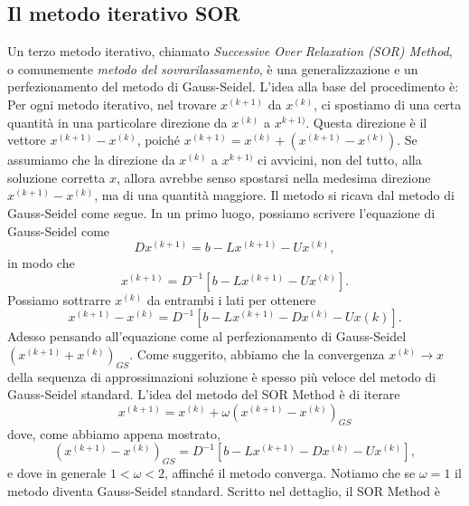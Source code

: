 \documentclass[12pt]{article}
\begin{document}
\subsection{Il metodo iterativo SOR}
Un terzo metodo iterativo, chiamato \textit{Successive Over Relaxation (SOR) Method}, o comunemente \textit{metodo del sovrarilassamento}, è una generalizzazione e un perfezionamento del metodo di Gauss-Seidel. L'idea alla base del procedimento è:
\\
Per ogni metodo iterativo, nel trovare \(x^{(k+1)}\) da \(x^{(k)}\), ci spostiamo di una certa quantità in una particolare direzione da \(x^{(k)}\) a \(x^{k+1)}\). Questa direzione è il vettore \(x^{(k+1)}-x^{(k)}\), poiché \(x^{(k+1)}=x^{(k)}+(x^{(k+1)}-x^{(k)})\). Se assumiamo che la direzione da \(x^{(k)}\) a \(x^{k+1)}\) ci avvicini, non del tutto, alla soluzione corretta \(x\), allora avrebbe senso spostarsi nella medesima direzione \(x^{(k+1)}-x^{(k)}\), ma di una quantità maggiore.
Il metodo si ricava dal metodo di Gauss-Seidel come segue. In un primo luogo, possiamo scrivere l'equazione di Gauss-Seidel come
\begin{equation*}
    Dx^{(k+1)}=b-Lx^{(k+1)}-Ux^{(k)},
\end{equation*}
in modo che
\begin{equation*}
    x^{(k+1)}=D^{-1}[b-Lx{^(k+1)}-Ux^{(k)}].
\end{equation*}
Possiamo sottrarre \(x^{(k)}\) da entrambi i lati per ottenere
\begin{equation*}
    x^{(k+1)}-x^{(k)}=D^{-1}[b-Lx^{(k+1)}-Dx^{(k)}-Ux{(k)}].
\end{equation*}
Adesso pensando all'equazione come al perfezionamento di Gauss-Seidel\\\(\left(x^{(k+1)}+x^{(k)}\right)_{GS}\). Come suggerito, abbiamo che la convergenza \(x^{(k)} \rightarrow x\) della sequenza di approssimazioni soluzione è spesso più veloce del metodo di Gauss-Seidel standard. L'idea del metodo del SOR Method è di iterare
\begin{equation*}
    x^{(k+1)}=x^{(k)}+ \omega \left(x^{(k+1)}-x^{(k)}\right)_{GS}
\end{equation*}
dove, come abbiamo appena mostrato,
\begin{equation*}
    \left(x^{(k+1)}-x^{(k)}\right)_{GS}=D^{-1}[b-Lx^{(k+1)}-Dx^{(k)}-Ux^{(k)}],
\end{equation*}
e dove in generale \(1<\omega<2\), affinché il metodo converga. Notiamo che se \(\omega=1\) il metodo diventa Gauss-Seidel standard.
Scritto nel dettaglio, il SOR Method è
\end{document}
